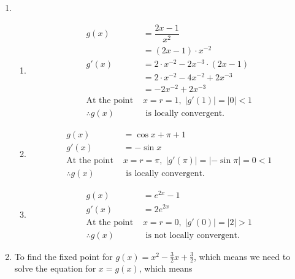 \documentclass{article}
\begin{document}




\begin{enumerate}
\item
\begin{enumerate}
\item

\begin{align*}
g(x)&= \dfrac{2x-1}{x^2}\\
&=(2x-1)\cdot x^{-2}\\
g'(x) &=2\cdot x^{-2} -2x^{-3}\cdot(2x-1)\\
&=2\cdot x^{-2} -4x^{-2}+2x^{-3}\\
&=-2x^{-2}+2x^{-3}\\
\mbox{At the point } &x = r=1,\; |g'(1)|=|0| < 1\\
\therefore g(x)  &\mbox{ is locally convergent.} 
\end{align*}
\item
\begin{align*}
g(x)&=\cos x +\pi+1\\
g'(x)&= -\sin x \\
\mbox{At the point } &x = r=\pi,\; |g'(\pi)|=|-\sin\pi|  = 0 < 1\\
\therefore g(x)  &\mbox{ is locally convergent.} 
\end{align*}
\item
\begin{align*}
g(x)&= e^{2x}-1\\
g'(x)&= 2e^{2x}\\
\mbox{At the point } &x = r=0,\; |g'(0)|=|2|  > 1\\
\therefore g(x)  &\mbox{ is not locally convergent.}
\end{align*}
\end{enumerate}
\item To find the fixed point for $g(x) = x^2-\frac{3}{2}x +\frac{3}{2}$, which means we need to solve the equation for $x = g(x)$, which means


\end{enumerate}
\end{document}
